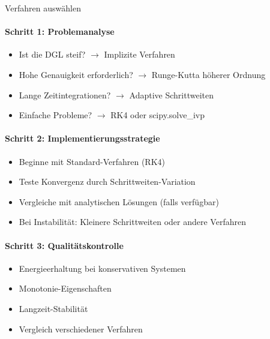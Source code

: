 \begin{KR}{Verfahren auswählen}
\paragraph{Schritt 1: Problemanalyse}
\begin{itemize}
    \item Ist die DGL steif? $\rightarrow$ Implizite Verfahren
    \item Hohe Genauigkeit erforderlich? $\rightarrow$ Runge-Kutta höherer Ordnung
    \item Lange Zeitintegrationen? $\rightarrow$ Adaptive Schrittweiten
    \item Einfache Probleme? $\rightarrow$ RK4 oder scipy.solve\_ivp
\end{itemize}

\paragraph{Schritt 2: Implementierungsstrategie}
\begin{itemize}
    \item Beginne mit Standard-Verfahren (RK4)
    \item Teste Konvergenz durch Schrittweiten-Variation
    \item Vergleiche mit analytischen Lösungen (falls verfügbar)
    \item Bei Instabilität: Kleinere Schrittweiten oder andere Verfahren
\end{itemize}

\paragraph{Schritt 3: Qualitätskontrolle}
\begin{itemize}
    \item Energieerhaltung bei konservativen Systemen
    \item Monotonie-Eigenschaften
    \item Langzeit-Stabilität
    \item Vergleich verschiedener Verfahren
\end{itemize}
\end{KR}

